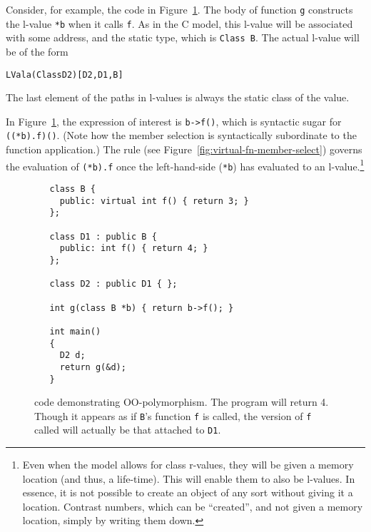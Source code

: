 \documentclass[11pt]{article}
\begin{document}
Consider, for example, the code in Figure~\ref{fig:oo-example}.  The
body of function \texttt{g} constructs the l-value \texttt{*b} when it
calls \texttt{f}.  As in the C model, this l-value will be associated
with some address, and the static type, which is \texttt{Class~B}.
The actual l-value will be of the form
\begin{alltt}
   LVal a (Class D2) [D2,D1,B]
\end{alltt}
The last element of the paths in l-values is always the static class
of the value.

In Figure~\ref{fig:oo-example}, the expression of interest is
\texttt{b->f()}, which is syntactic sugar for \texttt{((*b).f)()}.
(Note how the member selection is syntactically subordinate to the
function application.)  The 
rule (see Figure~\ref{fig:virtual-fn-member-select}) governs the
evaluation of \texttt{(*b).f} once the left-hand-side (\texttt{*b})
has evaluated to an l-value.\footnote{Even when the model allows for
  class r-values, they will be given a memory location (and thus, a
  life-time).  This will enable them to also be l-values.  In essence,
  it is not possible to create an object of any sort without giving it
  a location.  Contrast numbers, which can be ``created'', and not
  given a memory location, simply by writing them down.}

\begin{figure}[hbtp]
\begin{verbatim}
   class B {
     public: virtual int f() { return 3; }
   };

   class D1 : public B {
     public: int f() { return 4; }
   };

   class D2 : public D1 { };

   int g(class B *b) { return b->f(); }

   int main()
   {
     D2 d;
     return g(&d);
   }
\end{verbatim}
  \caption[\cpp{} Code Demonstrating OO-Polymorphism]{\cpp{} code
    demonstrating OO-polymorphism.  The program will return 4. Though
    it appears as if \texttt{B}'s function \texttt{f} is called, the
    version of \texttt{f} called will actually be that attached to
    \texttt{D1}.}
\label{fig:oo-example}
\end{figure}
\end{document}
